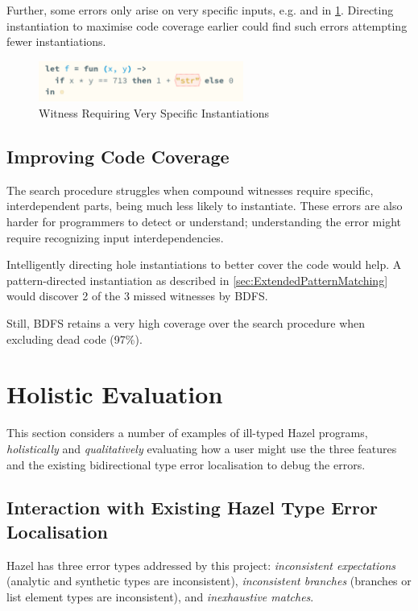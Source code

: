 Further, some errors only arise on very specific inputs, e.g.  and  in \cref{fig:SpecificInstantiations}. Directing instantiation to maximise code coverage earlier could find such errors attempting fewer instantiations.
\begin{figure}\centering
\includegraphics[width=0.6\textwidth]{Media/Figures/very_specific_error}
\caption{Witness Requiring Very Specific Instantiations}
\label{fig:SpecificInstantiations}
\end{figure}

\subsection{Improving Code Coverage}
\label{sec:EvalHoleInstantiation}
The search procedure struggles when compound witnesses require specific, interdependent parts, being much less likely to instantiate. These errors are also harder for programmers to detect or understand; understanding the error might require recognizing input interdependencies.

Intelligently directing hole instantiations to better cover the code would help. A pattern-directed instantiation as described in \cref{sec:ExtendedPatternMatching} would discover 2 of the 3 missed witnesses by BDFS.

Still, BDFS retains a very high coverage over the search procedure when excluding dead code (97\%).

\section{Holistic Evaluation}
\label{sec:HolisticEvaluation}

This section considers a number of examples of ill-typed Hazel programs, \textit{holistically} and \textit{qualitatively} evaluating how a user might use the three features and the existing bidirectional type error localisation \cite{MarkedLocalisation} to debug the errors. 


\subsection{Interaction with Existing Hazel Type Error Localisation}
Hazel has three error types addressed by this project: \textit{inconsistent expectations} (analytic and synthetic types are inconsistent), \textit{inconsistent branches }(branches or list element types are inconsistent), and \textit{inexhaustive matches}. 

